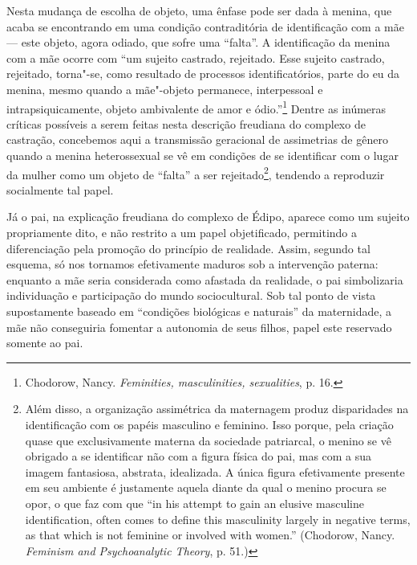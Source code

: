 Nesta mudança de escolha de objeto, uma ênfase pode ser dada à menina,
que acaba se encontrando em uma condição contraditória de identificação
com a mãe --- este objeto, agora odiado, que sofre uma ``falta''. A
identificação da menina com a mãe ocorre com ``um sujeito castrado,
rejeitado. Esse sujeito castrado, rejeitado, torna"-se, como resultado de
processos identificatórios, parte do eu da menina, mesmo quando a
mãe"-objeto permanece, interpessoal e intrapsiquicamente, objeto
ambivalente de amor e ódio.''\footnote{Chodorow, Nancy.
  \emph{Feminities, masculinities, sexualities}, p. 16.} Dentre as
inúmeras críticas possíveis a serem feitas nesta descrição freudiana do
complexo de castração, concebemos aqui a transmissão geracional de
assimetrias de gênero quando a menina heterossexual se vê em condições
de se identificar com o lugar da mulher como um objeto de ``falta'' a
ser rejeitado\footnote{Além disso, a organização assimétrica da
  maternagem produz disparidades na identificação com os papéis
  masculino e feminino. Isso porque, pela criação quase que
  exclusivamente materna da sociedade patriarcal, o menino se vê
  obrigado a se identificar não com a figura física do pai, mas com a
  sua imagem fantasiosa, abstrata, idealizada. A única figura
  efetivamente presente em seu ambiente é justamente aquela diante da
  qual o menino procura se opor, o que faz com que ``in his attempt to
  gain an elusive masculine identification, often comes to define this
  masculinity largely in negative terms, as that which is not feminine
  or involved with women.'' (Chodorow, Nancy. \emph{Feminism and
  Psychoanalytic Theory}, p. 51.)}, tendendo a reproduzir socialmente
tal papel.

Já o pai, na explicação freudiana do complexo de Édipo, aparece como um
sujeito propriamente dito, e não restrito a um papel objetificado,
permitindo a diferenciação pela promoção do princípio de realidade.
Assim, segundo tal esquema, só nos tornamos efetivamente maduros sob a
intervenção paterna: enquanto a mãe seria considerada como afastada da
realidade, o pai simbolizaria individuação e participação do mundo
sociocultural. Sob tal ponto de vista supostamente baseado em
``condições biológicas e naturais'' da maternidade, a mãe não
conseguiria fomentar a autonomia de seus filhos, papel este reservado
somente ao pai.

